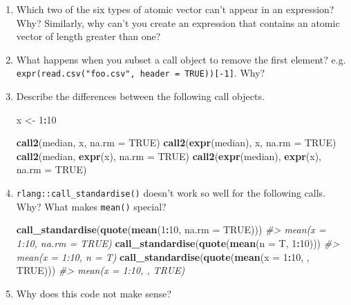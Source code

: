 \documentclass[]{book}
\newenvironment{Shaded}{\begin{snugshade}}{\end{snugshade}}
\newcommand{\CommentTok}[1]{\textcolor[rgb]{0.37,0.37,0.37}{\textit{#1}}}
\newcommand{\DataTypeTok}[1]{\textcolor[rgb]{0.27,0.27,0.27}{#1}}
\newcommand{\DecValTok}[1]{\textcolor[rgb]{0.06,0.06,0.06}{#1}}
\newcommand{\KeywordTok}[1]{\textcolor[rgb]{0.27,0.27,0.27}{\textbf{#1}}}
\newcommand{\NormalTok}[1]{#1}
\newcommand{\OperatorTok}[1]{\textcolor[rgb]{0.43,0.43,0.43}{\textbf{#1}}}
\newcommand{\OtherTok}[1]{\textcolor[rgb]{0.37,0.37,0.37}{#1}}
\newcommand{\StringTok}[1]{\textcolor[rgb]{0.5,0.5,0.5}{#1}}
\begin{document}
\begin{enumerate}
\def\labelenumi{\arabic{enumi}.}
\item
  Which two of the six types of atomic vector can't appear in an expression?
  Why? Similarly, why can't you create an expression that contains an atomic
  vector of length greater than one?
\item
  What happens when you subset a call object to remove the first element?
  e.g. \texttt{expr(read.csv("foo.csv",\ header\ =\ TRUE)){[}-1{]}}. Why?
\item
  Describe the differences between the following call objects.

\begin{Shaded}
\begin{Highlighting}[]
\NormalTok{x <-}\StringTok{ }\DecValTok{1}\OperatorTok{:}\DecValTok{10}

\KeywordTok{call2}\NormalTok{(median, x, }\DataTypeTok{na.rm =} \OtherTok{TRUE}\NormalTok{)}
\KeywordTok{call2}\NormalTok{(}\KeywordTok{expr}\NormalTok{(median), x, }\DataTypeTok{na.rm =} \OtherTok{TRUE}\NormalTok{)}
\KeywordTok{call2}\NormalTok{(median, }\KeywordTok{expr}\NormalTok{(x), }\DataTypeTok{na.rm =} \OtherTok{TRUE}\NormalTok{)}
\KeywordTok{call2}\NormalTok{(}\KeywordTok{expr}\NormalTok{(median), }\KeywordTok{expr}\NormalTok{(x), }\DataTypeTok{na.rm =} \OtherTok{TRUE}\NormalTok{)}
\end{Highlighting}
\end{Shaded}
\item
  \texttt{rlang::call\_standardise()} doesn't work so well for the following calls.
  Why? What makes \texttt{mean()} special?

\begin{Shaded}
\begin{Highlighting}[]
\KeywordTok{call_standardise}\NormalTok{(}\KeywordTok{quote}\NormalTok{(}\KeywordTok{mean}\NormalTok{(}\DecValTok{1}\OperatorTok{:}\DecValTok{10}\NormalTok{, }\DataTypeTok{na.rm =} \OtherTok{TRUE}\NormalTok{)))}
\CommentTok{#> mean(x = 1:10, na.rm = TRUE)}
\KeywordTok{call_standardise}\NormalTok{(}\KeywordTok{quote}\NormalTok{(}\KeywordTok{mean}\NormalTok{(}\DataTypeTok{n =}\NormalTok{ T, }\DecValTok{1}\OperatorTok{:}\DecValTok{10}\NormalTok{)))}
\CommentTok{#> mean(x = 1:10, n = T)}
\KeywordTok{call_standardise}\NormalTok{(}\KeywordTok{quote}\NormalTok{(}\KeywordTok{mean}\NormalTok{(}\DataTypeTok{x =} \DecValTok{1}\OperatorTok{:}\DecValTok{10}\NormalTok{, , }\OtherTok{TRUE}\NormalTok{)))}
\CommentTok{#> mean(x = 1:10, , TRUE)}
\end{Highlighting}
\end{Shaded}
\item
  Why does this code not make sense?


\end{enumerate}
\end{document}
